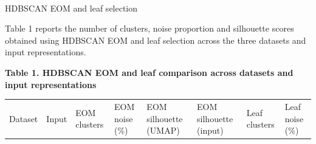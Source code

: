 \documentclass[
  letterpaper,
  DIV=11,
  numbers=noendperiod,
  sfdefaults=false]{scrartcl}
\makeatletter
\let\oldparagraph\paragraph
\renewcommand{\paragraph}{
    \@ifstar
      \xxxParagraphStar
      \xxxParagraphNoStar
  }
\newcommand{\xxxParagraphStar}[1]{\oldparagraph*{#1}\mbox{}}
\newcommand{\xxxParagraphNoStar}[1]{\oldparagraph{#1}\mbox{}}
\newcounter{none} %
\makeatother
\begin{document}
\paragraph{HDBSCAN EOM and leaf
selection}\label{hdbscan-eom-and-leaf-selection}

Table 1 reports the number of clusters, noise proportion and silhouette
scores obtained using HDBSCAN EOM and leaf selection across the three
datasets and input representations.

\textbf{Table 1. HDBSCAN EOM and leaf comparison across datasets and
input representations}

{\def\LTcaptype{none} %
\begin{longtable}[]{@{}
  >{\raggedright\arraybackslash}p{}
  >{\raggedright\arraybackslash}p{}
  >{\raggedleft\arraybackslash}p{}
  >{\raggedleft\arraybackslash}p{}
  >{\raggedleft\arraybackslash}p{}
  >{\raggedleft\arraybackslash}p{}
  >{\raggedleft\arraybackslash}p{}
  >{\raggedleft\arraybackslash}p{}@{}}
\toprule\noalign{}
\begin{minipage}[b]{\linewidth}\raggedright
Dataset
\end{minipage} & \begin{minipage}[b]{\linewidth}\raggedright
Input
\end{minipage} & \begin{minipage}[b]{\linewidth}\raggedleft
EOM clusters
\end{minipage} & \begin{minipage}[b]{\linewidth}\raggedleft
EOM noise (\%)
\end{minipage} & \begin{minipage}[b]{\linewidth}\raggedleft
EOM silhouette (UMAP)
\end{minipage} & \begin{minipage}[b]{\linewidth}\raggedleft
EOM silhouette (input)
\end{minipage} & \begin{minipage}[b]{\linewidth}\raggedleft
Leaf clusters
\end{minipage} & \begin{minipage}[b]{\linewidth}\raggedleft
Leaf noise (\%)
\end{minipage} \\

\end{longtable}}
\end{document}
